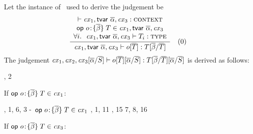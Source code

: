 \begin{bycase}
\Case{\Reop}\\
Let the instance of \Reop\ used to derive the judgement be
\[
\frac{\begin{array}{c}\vdash\mathit{cx}_1,\mathsf{tvar}\ \overline{\alpha},\mathit{cx}_3:\textsc{context}\\\mathsf{op}\ o\!:\!\{\overline{\beta}\}\;T\in\mathit{cx}_1,\mathsf{tvar}\ \overline{\alpha},\mathit{cx}_3\\\forall i.\ \ \mathit{cx}_1,\mathsf{tvar}\ \overline{\alpha},\mathit{cx}_3\vdash T_i:\textsc{type}\end{array}}{\mathit{cx}_1,\mathsf{tvar}\ \overline{\alpha},\mathit{cx}_3\vdash o[\overline{T}]:T[\overline{\beta}/\overline{T}]}\quad\mbox{(0)}
\]
The judgement
$\mathit{cx}_1,\mathit{cx}_2,\mathit{cx}_3[\overline{\alpha}/\overline{S}]\vdash o[\overline{T}][\overline{\alpha}/\overline{S}]:T[\overline{\beta}/\overline{T}][\overline{\alpha}/\overline{S}]$
is derived as follows:
\begin{derivation}
     {\indhyp, 2}
\end{derivation}
If $\mathsf{op}\ o\!:\!\{\overline{\beta}\}\;T\in\mathit{cx}_1$:
\begin{derivatioN}{5}
     {\Reop, 1, 6, 3}
\step{\op{\onam}{\tsbslash{\typS}{\tvarIS}{\typIS}}=
      \tsbslash{\opO}{\tvarIS}{\typIS}}
     {}
     {\hyp\ $\mathsf{op}\ o\!:\!\{\overline{\beta}\}\;T\in\mathit{cx}_1$}
     {, 1, 11}
\step{\tsbslash{\tsbslash{\typ}{\tvarS}{\typS}}{\tvarIS}{\typIS}=
      \tsbslash{\typ}{\tvarS}{\tsbslash{\typS}{\tvarIS}{\typIS}}}
     {, 15}
     {7, 8, 16}
\end{derivatioN}
If $\mathsf{op}\ o\!:\!\{\overline{\beta}\}\;T\in\mathit{cx}_3$:
\begin{derivatioN}{5}

\end{derivatioN}
\end{bycase}
